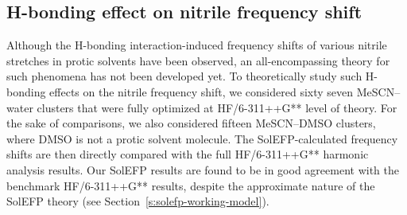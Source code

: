 \documentclass[a4paper,titlepage,twoside,fleqn,12pt]{book}
\begin{document}
\begin{refsection}
\section{H-bonding effect on nitrile frequency shift}

Although the H-bonding interaction\hyp{}induced frequency shifts
of various nitrile stretches in protic solvents have been
observed, an all\hyp{}encompassing theory for such phenomena has
not been developed yet. To theoretically study such H-bonding
effects on the nitrile frequency shift, we considered sixty seven
MeSCN--water clusters that were fully optimized at HF/6-311++G** 
level of theory. For the sake of comparisons, we
also considered fifteen MeSCN--DMSO clusters, where DMSO is
not a protic solvent molecule. The SolEFP\hyp{}calculated frequency
shifts are then directly compared with the full HF/6-311++G**
harmonic analysis results. Our SolEFP results are found to be in
good agreement with the benchmark HF/6-311++G** results,
despite the approximate nature of the SolEFP theory (see
Section~\ref{s:solefp-working-model}).


\end{refsection}
\end{document}
